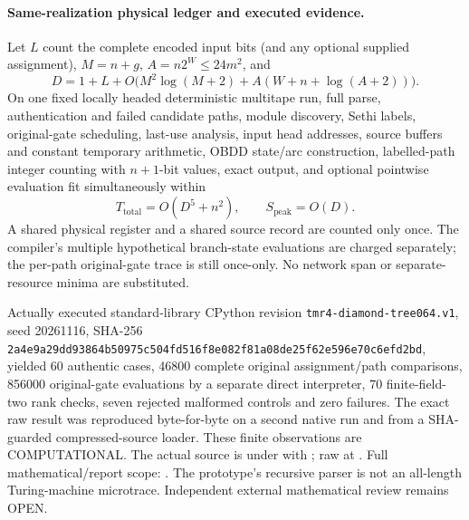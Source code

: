\documentclass[11pt]{article}
\begin{document}
\paragraph{Same-realization physical ledger and executed evidence.}
Let $L$ count the complete encoded input bits (and any optional supplied assignment), $M=n+g$, $A=n2^W\le24m^2$, and
\[
D=1+L+O\bigl(M^2\log(M+2)+A(W+n+\log(A+2))\bigr).
\]
On one fixed locally headed deterministic multitape run, full parse, authentication and failed candidate paths, module discovery, Sethi labels, original-gate scheduling, last-use analysis, input head addresses, source buffers and constant temporary arithmetic, OBDD state/arc construction, labelled-path integer counting with $n+1$-bit values, exact output, and optional pointwise evaluation fit simultaneously within
\[
T_{\mathrm{total}}=O(D^5+n^2),\qquad S_{\mathrm{peak}}=O(D).
\]
A shared physical register and a shared source record are counted only once. The compiler's multiple hypothetical branch-state evaluations are charged separately; the per-path original-gate trace is still once-only. No network span or separate-resource minima are substituted.

Actually executed standard-library CPython revision \texttt{tmr4-diamond-tree064.v1}, seed 20261116, SHA-256 \texttt{2a4e9a29dd93864b50975c504fd516f8e082f81a08de25f62e596e70c6efd2bd}, yielded 60 authentic cases, 46800 complete original assignment/path comparisons, 856000 original-gate evaluations by a separate direct interpreter, 70 finite-field-two rank checks, seven rejected malformed controls and zero failures. The exact raw result was reproduced byte-for-byte on a second native run and from a SHA-guarded compressed-source loader. These finite observations are COMPUTATIONAL. The actual source is under  with ; raw at . Full mathematical/report scope: . The prototype's recursive parser is not an all-length Turing-machine microtrace. Independent external mathematical review remains OPEN.
\end{document}
